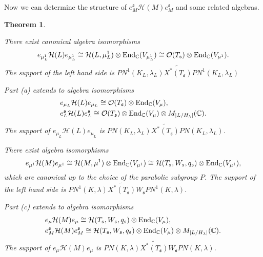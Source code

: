 \documentclass[11pt]{amsart}
\newtheorem{thm}{Theorem}[section]
\theoremstyle{definition}
\begin{document}
Now we can determine the structure of $e^{{\mathfrak s}}_M {{\mathcal H}} (M) e^{{\mathfrak s}}_M$ and some related algebras.

\begin{thm}\label{thm:3.6}
{\begin{enumerate} {{
\item
There exist canonical algebra isomorphisms 
\[
e_{\mu_L^1} {{\mathcal H}} (L) e_{\mu_L^1} \cong {{\mathcal H}} (L,\mu_L^1) \otimes 
{{\rm End}}_{\mathbb C} (V_{\mu_L^1}) \cong \mathcal O (T_{{\mathfrak s}}) \otimes {{\rm End}}_{\mathbb C} (V_{\mu^1}) .
\]
The support of the left hand side is
$PN^1 (K_L,\lambda_L) \widetilde{X^* (T_{{\mathfrak s}})} PN^1 (K_L,\lambda_L)$
\item Part (a) extends to algebra isomorphisms
\begin{align*}
& e_{\mu_L} {{\mathcal H}} (L) e_{\mu_L} \cong \mathcal O (T_{{\mathfrak s}}) \otimes {{\rm End}}_{\mathbb C} (V_\mu) , \\
& e^{{\mathfrak s}}_L {{\mathcal H}} (L) e^{{\mathfrak s}}_L \cong 
\mathcal O (T_{{\mathfrak s}}) \otimes {{\rm End}}_{\mathbb C} (V_\mu) \otimes M_{|L / H_\lambda|}({\mathbb C}) .
\end{align*}
The support of $e_{\mu_L} {{\mathcal H}} (L) e_{\mu_L}$ is 
$PN (K_L,\lambda_L) \widetilde{X^* (T_{{\mathfrak s}})} PN (K_L,\lambda_L)$.
\item There exist algebra isomorphisms
\[
e_{\mu^1} {{\mathcal H}} (M) e_{\mu^1} \cong {{\mathcal H}} (M,\mu^1) \otimes {{\rm End}}_{\mathbb C} (V_{\mu^1}) 
\cong {{\mathcal H}} (T_{{\mathfrak s}}, W_{{\mathfrak s}}, q_{{\mathfrak s}}) \otimes {{\rm End}}_{\mathbb C} (V_{\mu^1}) ,
\]
which are canonical up to the choice of the parabolic subgroup $P$. 
The support of the left hand side is
$PN^1 (K,\lambda) \widetilde{X^* (T_{{\mathfrak s}})} W_{{\mathfrak s}} PN^1 (K,\lambda)$.
\item Part (c) extends to algebra isomorphisms
\begin{align*}
& e_\mu {{\mathcal H}} (M) e_\mu \cong {{\mathcal H}} (T_{{\mathfrak s}}, W_{{\mathfrak s}}, q_{{\mathfrak s}}) \otimes {{\rm End}}_{\mathbb C} (V_\mu) , \\
& e^{{\mathfrak s}}_M {{\mathcal H}} (M) e^{{\mathfrak s}}_M \cong {{\mathcal H}} (T_{{\mathfrak s}}, W_{{\mathfrak s}}, q_{{\mathfrak s}})
\otimes {{\rm End}}_{\mathbb C} (V_\mu) \otimes M_{|L / H_\lambda|}({\mathbb C}) .
\end{align*}
The support of $e_\mu {{\mathcal H}} (M) e_\mu$ is 
$PN (K,\lambda) \widetilde{X^* (T_{{\mathfrak s}})} W_{{\mathfrak s}} PN (K,\lambda)$.
}} \end{enumerate}}
\end{thm}
\end{document}
